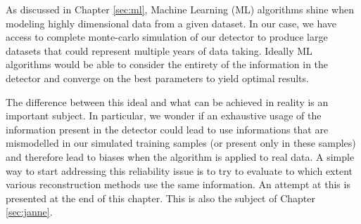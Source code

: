 \documentclass[../main.tex]{subfiles}
\begin{document}
{{%

As discussed in Chapter \ref{sec:ml}, Machine Learning (ML) algorithms shine when modeling highly dimensional data from a given dataset. In our case, we have access to complete monte-carlo simulation of our detector to produce large datasets that could represent multiple years of data taking.
Ideally ML algorithms would be able to consider the entirety of the information in the detector and converge on the best parameters to yield optimal results.

The difference between this ideal and what can be achieved in reality is an important subject. In particular, we wonder if an exhaustive usage of the information present in the detector could lead to use informations that are mismodelled in our simulated training samples (or present only in these samples) and therefore lead to biases when the algorithm is applied to real data.
A simple way to start addressing this reliability issue is to try to evaluate to which extent various reconstruction methods use the same information. An attempt at this is presented at the end of this chapter. This is also the subject of Chapter \ref{sec:janne}.


}}
\end{document}
